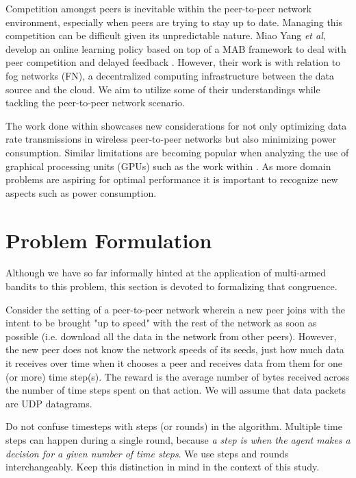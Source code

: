 \documentclass{article}
\begin{document}
Competition amongst peers is inevitable within the peer-to-peer network environment, especially when peers are trying to stay up to date. Managing this competition can be 
difficult given its unpredictable nature. Miao Yang \textit{et al}, develop an online learning policy based on top of a MAB framework to deal with peer competition and 
delayed feedback \cite{p2p_offloading_with_delayed_feedback}. However, their work is with relation to fog networks (FN), a decentralized computing infrastructure between 
the data source and the cloud. We aim to utilize some of their understandings while tackling the peer-to-peer network scenario. 

The work done within \cite{p2p_net_sender_scheduling} showcases new considerations for not only optimizing data rate transmissions in wireless peer-to-peer networks but also 
minimizing power consumption. Similar limitations are becoming popular when analyzing the use of graphical processing units (GPUs) such as the work within \cite{gpu_eng}. As 
more domain problems are aspiring for optimal performance it is important to recognize new aspects such as power consumption. 



\section{Problem Formulation}

Although we have so far informally hinted at the application of multi-armed bandits to this problem, this section is devoted to formalizing that congruence.

Consider the setting of a peer-to-peer network wherein a new peer joins with the intent to be brought "up to speed" with the rest of the network as soon as 
possible (i.e. download all the data in the network from other peers). However, the new peer does not know the network speeds of its seeds, just how much data 
it receives over time when it chooses a peer and receives data from them for one (or more) time step(s). The reward is the average number of bytes received across 
the number of time steps spent on that action. We will assume that data packets are UDP datagrams.

\begin{center}
    Do not confuse timesteps with steps (or rounds) in the algorithm. Multiple time steps can happen during a single round, because \emph{a step is when the agent makes a 
decision for a given number of time steps}. We use steps and rounds interchangeably. Keep this distinction in mind in the context of this study.
\end{center}
\end{document}
